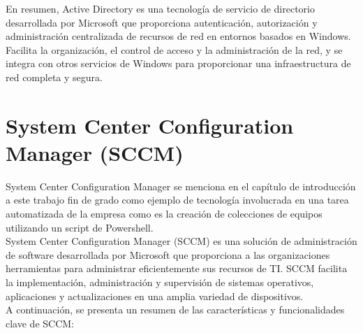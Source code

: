 \documentclass[a4paper, 12pt]{book}
\begin{document}
En resumen, Active Directory es una tecnología de servicio de directorio desarrollada por Microsoft que proporciona autenticación, autorización y administración centralizada de recursos de red en entornos basados en Windows. Facilita la organización, el control de acceso y la administración de la red, y se integra con otros servicios de Windows para proporcionar una infraestructura de red completa y segura.

\section{System Center Configuration Manager (SCCM)} 
\label{sec:System Center Configuration Manager (SCCM)}

System Center Configuration Manager se menciona en el capítulo de introducción a este trabajo fin de grado como ejemplo de tecnología involucrada en una tarea automatizada de la empresa como es la creación de colecciones de equipos utilizando un script de Powershell.
\\

System Center Configuration Manager (SCCM) es una solución de administración de software desarrollada por Microsoft que proporciona a las organizaciones herramientas para administrar eficientemente sus recursos de TI. SCCM facilita la implementación, administración y supervisión de sistemas operativos, aplicaciones y actualizaciones en una amplia variedad de dispositivos.
\\

A continuación, se presenta un resumen de las características y funcionalidades clave de SCCM:
\end{document}
